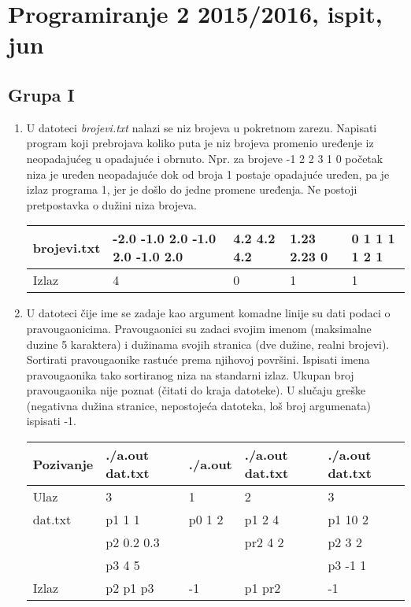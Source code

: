 \section{Programiranje 2 2015/2016, ispit, jun}
\subsection{Grupa I}

\begin{enumerate}
\item U datoteci \textit{brojevi.txt} nalazi se niz brojeva u pokretnom zarezu. Napisati program koji prebrojava koliko puta je niz brojeva promenio uređenje iz neopadajućeg u opadajuće i obrnuto. Npr. za brojeve -1 2 2 3 1 0 početak niza je uređen neopadajuće dok od broja 1 postaje opadajuće uređen, pa je izlaz programa 1, jer je došlo do jedne promene uređenja. Ne postoji pretpostavka o du\v zini niza brojeva.

\small
\begin{tabular}{ |l|l|l|l|l| }
\hline 
  brojevi.txt & -2.0 -1.0 2.0 -1.0 2.0 -1.0 2.0  & 4.2 4.2 4.2 & 1.23 2.23 0 & 0 1 1 1 1 2 1 \\ \hline 
  Izlaz & 4 & 0 & 1 & 1 \\ \hline 
\end{tabular}
\normalsize

\item U datoteci \v cije ime se zadaje kao argument komadne linije su dati podaci o pravougaonicima. Pra\-vo\-uga\-oni\-ci su zadaci svojim imenom
   (maksimalne duzine 5 karaktera) i du\v zinama svojih stranica (dve du\v zine, realni brojevi). Sortirati pravougaonike rastu\' ce prema njihovoj povr\v sini.
   Ispisati imena pravougaonika tako sortiranog niza na standarni izlaz. 
   Ukupan broj pravougaonika nije poznat (\v citati do kraja datoteke).
   U slu\v caju gre\v ske (negativna du\v zina stranice, nepostoje\' ca datoteka, lo\v s broj argumenata) ispisati -1.

\small
\begin{tabular}{ |l|l|l|l|l| }
\hline 
  Pozivanje & ./a.out dat.txt  & ./a.out & ./a.out dat.txt & ./a.out dat.txt \\ \hline 
  Ulaz & 3 & 1 & 2 & 3 \\ \hline
  dat.txt & p1 1 1      & p0 1 2  & p1 2 4 & p1 10 2 \\
          & p2 0.2 0.3  &         & pr2 4 2 & p2 3 2 \\ 
          & p3 4 5  &   &         & p3 -1 1 \\ \hline
  Izlaz & p2 p1 p3  & -1      & p1 pr2 & -1 \\ \hline 
\end{tabular}
\normalsize



\end{enumerate}
